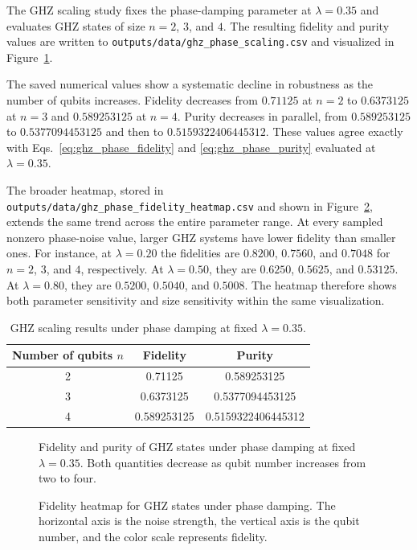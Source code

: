 The GHZ scaling study fixes the phase-damping parameter at $\lambda=0.35$ and evaluates GHZ states of size $n=2$, $3$, and $4$. The resulting fidelity and purity values are written to \texttt{outputs/data/ghz\_phase\_scaling.csv} and visualized in Figure~\ref{fig:ghz_scaling}.

The saved numerical values show a systematic decline in robustness as the number of qubits increases. Fidelity decreases from $0.71125$ at $n=2$ to $0.6373125$ at $n=3$ and $0.589253125$ at $n=4$. Purity decreases in parallel, from $0.589253125$ to $0.5377094453125$ and then to $0.5159322406445312$. These values agree exactly with Eqs.~\eqref{eq:ghz_phase_fidelity} and \eqref{eq:ghz_phase_purity} evaluated at $\lambda=0.35$.

The broader heatmap, stored in \texttt{outputs/data/ghz\_phase\_fidelity\_heatmap.csv} and shown in Figure~\ref{fig:ghz_heatmap}, extends the same trend across the entire parameter range. At every sampled nonzero phase-noise value, larger GHZ systems have lower fidelity than smaller ones. For instance, at $\lambda=0.20$ the fidelities are $0.8200$, $0.7560$, and $0.7048$ for $n=2$, $3$, and $4$, respectively. At $\lambda=0.50$, they are $0.6250$, $0.5625$, and $0.53125$. At $\lambda=0.80$, they are $0.5200$, $0.5040$, and $0.5008$. The heatmap therefore shows both parameter sensitivity and size sensitivity within the same visualization.

\begin{table}[t]
\centering
\caption{GHZ scaling results under phase damping at fixed $\lambda = 0.35$.}
\label{tab:ghz_scaling}
\begin{tabular}{ccc}
\toprule
Number of qubits $n$ & Fidelity & Purity \\
\midrule
2 & 0.71125 & 0.589253125 \\
3 & 0.6373125 & 0.5377094453125 \\
4 & 0.589253125 & 0.5159322406445312 \\
\bottomrule
\end{tabular}
\end{table}

\begin{figure}[t]
\centering
{}
\caption{Fidelity and purity of GHZ states under phase damping at fixed $\lambda=0.35$. Both quantities decrease as qubit number increases from two to four.}
\label{fig:ghz_scaling}
\end{figure}

\begin{figure}[t]
\centering
{}
\caption{Fidelity heatmap for GHZ states under phase damping. The horizontal axis is the noise strength, the vertical axis is the qubit number, and the color scale represents fidelity.}
\label{fig:ghz_heatmap}
\end{figure}
